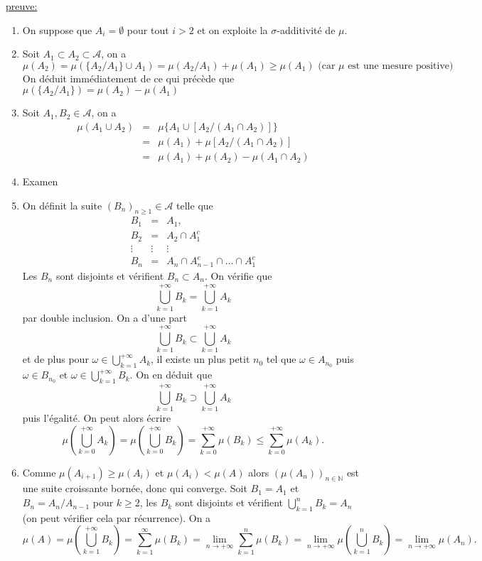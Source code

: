 \documentclass[8pt,notheorems]{beamer}
\def \N{\mathbb N}
\theoremstyle{definition}
\theoremstyle{example}
\theoremstyle{mystyle}
\theoremstyle{plain}
\begin{document}
\begin{frame}[allowframebreaks]
\underline{preuve:}
\begin{enumerate}
\item On suppose que $A_i = \emptyset$ pour tout $i>2$ et on exploite la $\sigma$-additivité de $\mu$.
\item Soit $A_1\subset A_2\subset\mathcal{A}$, on a
$$
\mu(A_2)=\mu(\{A_2/A_1\} \cup A_1)=\mu(A_2/A_1) + \mu(A_1)\geq \mu(A_1)\text{ (car $\mu$ est une mesure positive)}
$$
On déduit immédiatement de ce qui précède que $\mu(\{A_2/A_1\})=\mu(A_2)-\mu(A_1)$
\item Soit $A_1,B_2\in\mathcal{A}$, on a
\begin{eqnarray*}
\mu(A_1\cup A_2)&=&\mu\{A_1\cup [A_2/(A_1\cap A_2)]\}\\
&=&\mu(A_1)+\mu[A_2/(A_1\cap A_2)]\\
&=&\mu(A_1)+\mu(A_2)-\mu(A_1\cap A_2)
\end{eqnarray*}
\item Examen
\item On définit la suite $(B_n)_{n\geq1}\in\mathcal{A}$ telle que 
\begin{eqnarray*}
B_1 &=& A_1,\\
 B_2 &=& A_2\cap A_1^c\\
 \vdots&\vdots&\vdots\\ 
 B_n &= &A_n\cap A_{n-1}^c\cap\ldots\cap A_1^{c}
\end{eqnarray*}
Les $B_n$ sont disjoints et vérifient $B_n\subset A_n$. On vérifie que 
$$
\bigcup_{k=1}^{+\infty}B_k = \bigcup_{k=1}^{+\infty}A_k
$$ 
par double inclusion. On a d'une part 
$$
\bigcup_{k=1}^{+\infty}B_k \subset \bigcup_{k=1}^{+\infty}A_k
$$ 
et de plus pour $\omega\in \bigcup_{k=1}^{+\infty}A_k$, il existe un plus petit $n_0$ tel que $\omega\in A_{n_0}$ puis $\omega\in B_{n_0}$ et $\omega \in \bigcup_{k=1}^{+\infty}B_k$. On en déduit que 
$$
\bigcup_{k=1}^{+\infty}B_k \supset \bigcup_{k=1}^{+\infty}A_k
$$ 
puis l'égalité. On peut alors écrire 
$$
\mu\left(\bigcup_{k=0}^{+\infty}A_k\right) = \mu\left(\bigcup_{k=0}^{+\infty}B_k\right) = \sum_{k = 0}^{+\infty}\mu(B_k)\leq \sum_{k = 0}^{+\infty}\mu(A_k).  
$$
\item Comme $\mu(A_{i+1})\geq\mu(A_i)$ et $\mu(A_i)<\mu(A)$ alors $(\mu(A_n))_{n\in\N}$  est une suite croissante bornée, donc qui converge. Soit $B_1 = A_1$ et $B_n=A_{n}/A_{n-1}$ pour $k\geq2$, les $B_k$ sont disjoints et vérifient $\bigcup_{k=1}^{n}B_k = A_n$ (on peut vérifier cela par récurrence). On a 
$$
\mu(A) = \mu\left(\bigcup_{k=1}^{+\infty}B_k\right) = \sum_{k = 1}^{\infty}\mu(B_k) = \underset{n\rightarrow +\infty}{\lim} \sum_{k = 1}^{n}\mu(B_k) =\underset{n\rightarrow +\infty}{\lim} \mu(\bigcup_{k = 1}^{n}B_k) = \underset{n\rightarrow +\infty}{\lim} \mu(A_n).  
$$
\end{enumerate}
\end{frame}
\end{document}
